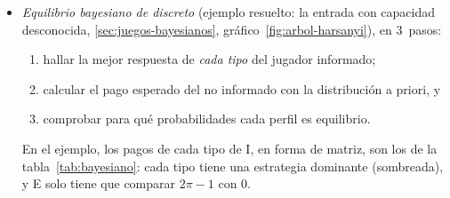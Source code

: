 \documentclass[11pt]{article}
\begin{document}
\begin{itemize}
\begin{itemize}
  \item El subjuego tiene 3~EN: (Izquierda, Izquierda), (Derecha, Derecha) y uno en mixtas. En este, el 2~queda indiferente si $\pi_1\cdot1=(1-\pi_1)\cdot3$, es decir, $\pi_1=3/4$, y el 1~si $3\pi_2=1-\pi_2$, es decir, $\pi_2=1/4$ ($\pi_i$, probabilidad de Izquierda); los pagos esperados son $(3/4,\,3/4)$.
  \item Sustituyendo hacia atrás: con (Izquierda, Izquierda), el 1~entra ($3>2$); con (Derecha, Derecha) o el mixto, se queda fuera ($2>1$ y $2>3/4$). Hay 3~ENPS.
  \item (Fuera e Izquierda si entra; Derecha si entra) es EN de todo el juego, pero no ENPS, porque (Izquierda, Derecha) no es EN del subjuego.
  \end{itemize}
\item \emph{Equilibrio bayesiano de  discreto} (ejemplo resuelto: la entrada con capacidad desconocida, \ref{sec:juegos-bayesianos}, gráfico~\ref{fig:arbol-harsanyi}), en 3~pasos:
  \begin{enumerate}
  \item hallar la mejor respuesta de \emph{cada tipo} del jugador informado;
  \item calcular el pago esperado del no informado con la distribución a priori, y
  \item comprobar para qué probabilidades cada perfil es equilibrio.
  \end{enumerate}
  En el ejemplo, los pagos de cada tipo de \textup{I}, en forma de matriz, son los de la tabla~\ref{tab:bayesiano}: cada tipo tiene una estrategia dominante (sombreada), y E solo tiene que comparar $2\pi-1$ con 0.
\end{itemize}
\end{document}
